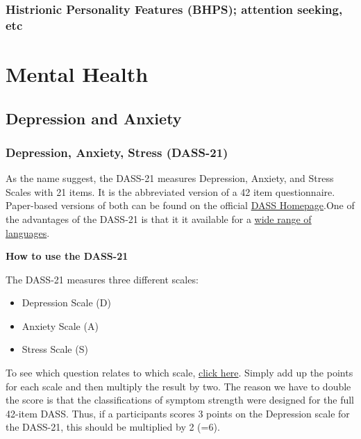 \documentclass[
]{book}
\providecommand{\tightlist}{%
  \setlength{\itemsep}{0pt}\setlength{\parskip}{0pt}}
\begin{document}
\hypertarget{histrionic-personality-features-bhps-attention-seeking-etc}{%
\subsection{Histrionic Personality Features (BHPS); attention seeking, etc}\label{histrionic-personality-features-bhps-attention-seeking-etc}}

\hypertarget{mental-health}{%
\chapter{Mental Health}\label{mental-health}}

\hypertarget{depression-and-anxiety}{%
\section{Depression and Anxiety}\label{depression-and-anxiety}}

\hypertarget{depression-anxiety-stress-dass-21}{%
\subsection{Depression, Anxiety, Stress (DASS-21)}\label{depression-anxiety-stress-dass-21}}

As the name suggest, the DASS-21 measures Depression, Anxiety, and Stress Scales with 21 items. It is the abbreviated version of a 42 item questionnaire. Paper-based versions of both can be found on the official \href{http://www2.psy.unsw.edu.au/groups/dass/}{DASS Homepage}.One of the advantages of the DASS-21 is that it it available for a \href{http://www2.psy.unsw.edu.au/groups/dass/translations.htm}{wide range of languages}.

\textbf{How to use the DASS-21}

The DASS-21 measures three different scales:

\begin{itemize}
\tightlist
\item
  Depression Scale (D)
\item
  Anxiety Scale (A)
\item
  Stress Scale (S)
\end{itemize}

To see which question relates to which scale, \href{link}{click here}. Simply add up the points for each scale and then multiply the result by two. The reason we have to double the score is that the classifications of symptom strength were designed for the full 42-item DASS. Thus, if a participants scores 3 points on the Depression scale for the DASS-21, this should be multiplied by 2 (=6).
\end{document}
